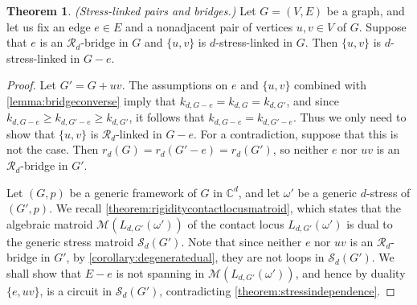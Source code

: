\documentclass[11pt,a4paper,dvipsnames]{scrartcl}
\theoremstyle{definition}
\newtheorem{theorem}{Theorem}[section]
\newcommand{\CC}{\mathbb{C}}
\newcommand{\stressnullity}[1]{k_{d, #1}}
\newcommand{\algmat}[1]{\mathcal{M}(#1)}
\newcommand{\stressmatroid}[2]{\mathcal{S}_{#1}(#2)}
\newcommand{\strongly}[1]{${#1}$-stress-linked}
\newcommand{\contactlocus}[2]{L_{#1,#2}}
\begin{document}
\begin{theorem}\label{theorem:bridgegloballylinked}\emph{(Stress-linked pairs and bridges.)}\newline
    Let $G = (V,E)$ be a graph, and let us fix an edge $e \in E$ and a nonadjacent pair of vertices $u,v \in V$ of $G$. Suppose that $e$ is an $\mathcal{R}_d$-bridge in $G$ and $\{u,v\}$ is \strongly{d} in $G$. Then $\{u,v\}$ is \strongly{d} in $G-e$.
\end{theorem}
\begin{proof}
    Let $G' = G + uv$. The assumptions on $e$ and $\{u,v\}$ combined with \cref{lemma:bridgeconverse} imply that $\stressnullity{G-e} = \stressnullity{G} = \stressnullity{G'}$, and since $\stressnullity{G-e} \geq \stressnullity{G'-e} \geq \stressnullity{G'}$, it follows that $\stressnullity{G-e} = \stressnullity{G'-e}$. Thus we only need to show that $\{u,v\}$ is $\mathcal{R}_d$-linked in $G-e$. For a contradiction, suppose that this is not the case. Then $r_d(G) = r_d(G'-e) = r_d(G')$, so neither $e$ nor $uv$ is an $\mathcal{R}_d$-bridge in $G'$. 
    
    Let $(G,p)$ be a generic framework of $G$ in $\CC^d$, and let $\omega'$ be a generic $d$-stress of $(G',p)$. We recall \cref{theorem:rigiditycontactlocusmatroid}, which states that the algebraic matroid $\algmat{\contactlocus{d}{G'}(\omega')}$ of the contact locus $\contactlocus{d}{G'}(\omega')$ is dual to the generic stress matroid $\stressmatroid{d}{G'}$. Note that since neither $e$ nor $uv$ is an $\mathcal{R}_d$-bridge in $G'$, by \cref{corollary:degeneratedual}, they are not loops in $\stressmatroid{d}{G'}$. We shall show that $E - e$ is not spanning in $\algmat{\contactlocus{d}{G'}(\omega')}$, and hence by duality $\{e,uv\}$, is a circuit in $\stressmatroid{d}{G'}$, contradicting \cref{theorem:stressindependence}. 
    

\end{proof}
\end{document}
